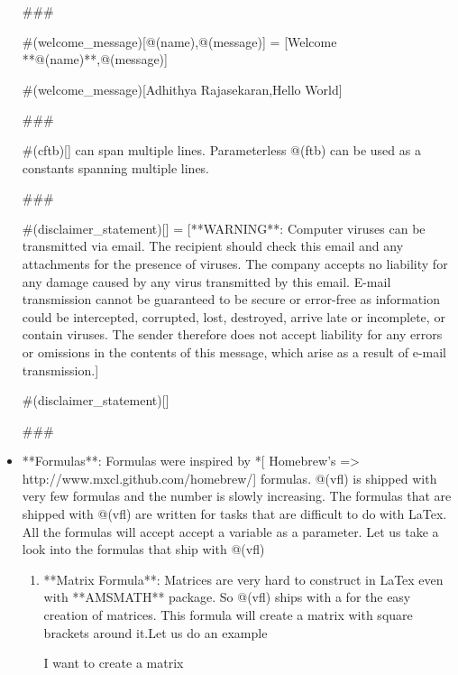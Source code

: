 \documentclass{article}
\begin{document}
\begin{itemize}
###


#(welcome_message)[@(name),@(message)] = [Welcome **@(name)**,@(message)] %


#(welcome_message)[Adhithya Rajasekaran,Hello World] %

###

#(cftb)[] can span multiple lines. Parameterless @(ftb) can be used as a constants spanning multiple lines. 

###


#(disclaimer_statement)[] = [**WARNING**: Computer viruses can be transmitted via email. 
The recipient should check this email and any attachments for the presence of viruses. 
The company accepts no liability for any damage caused by any virus transmitted by this email.
E-mail transmission cannot be guaranteed to be secure or error-free as information could be 
intercepted, corrupted, lost, destroyed, arrive late or incomplete, or contain viruses. 
The sender therefore does not accept liability for any errors or omissions in the 
contents of this message, which arise as a result of e-mail transmission.] 


#(disclaimer_statement)[] %

###

\item **Formulas**: Formulas were inspired by *[ Homebrew's => http://www.mxcl.github.com/homebrew/] formulas. @(vfl) is shipped with very few formulas
and the number is slowly increasing. The formulas that are shipped with @(vfl) are written for tasks that are difficult to do with LaTex. All the formulas will accept
accept a variable as a parameter. Let us take a look into the formulas that ship with @(vfl)

\begin{enumerate}

\item **Matrix Formula**: Matrices are very hard to construct in LaTex even with **AMSMATH** package. So @(vfl) ships with a %
for the easy creation of matrices. This formula will create a matrix with square brackets around it.Let us do an example 

I want to create a matrix \vspace{5pt}


\end{enumerate}
\end{itemize}
\end{document}
